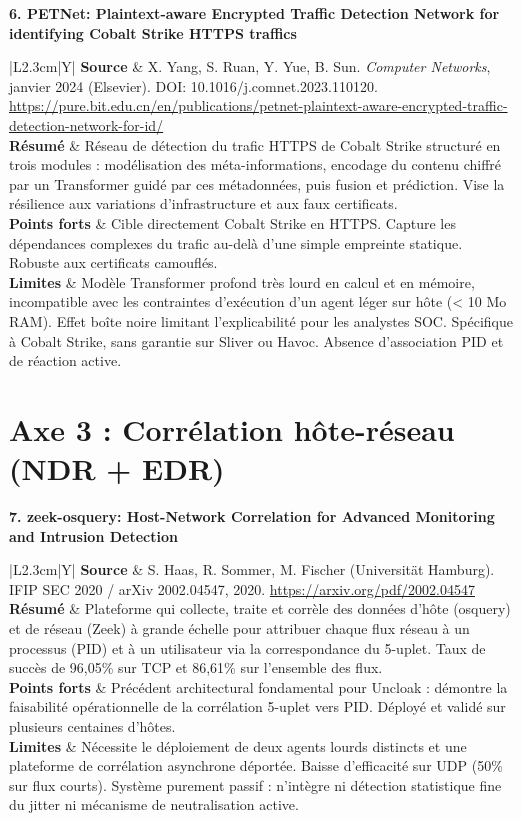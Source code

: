 \documentclass[10pt,a4paper]{article}
\newcommand{\articlecard}[5]{
    \noindent\textbf{#1}\par\vspace{1.2mm}
    \noindent\begin{tabularx}{\textwidth}{|L{2.3cm}|Y|}
        \hline
        \textbf{Source} & #2 \\ \hline
        \textbf{Résumé} & #3 \\ \hline
        \textbf{Points forts} & #4 \\ \hline
        \textbf{Limites} & #5 \\ \hline
    \end{tabularx}
    \vspace{3.5mm}
}
\begin{document}
\articlecard{6. PETNet: Plaintext-aware Encrypted Traffic Detection Network for identifying Cobalt Strike HTTPS traffics}{
X. Yang, S. Ruan, Y. Yue, B. Sun. \textit{Computer Networks}, janvier 2024 (Elsevier). DOI: 10.1016/j.comnet.2023.110120.\newline
\url{https://pure.bit.edu.cn/en/publications/petnet-plaintext-aware-encrypted-traffic-detection-network-for-id/}
}{
Réseau de détection du trafic HTTPS de Cobalt Strike structuré en trois modules : modélisation des méta-informations, encodage du contenu chiffré par un Transformer guidé par ces métadonnées, puis fusion et prédiction. Vise la résilience aux variations d'infrastructure et aux faux certificats.
}{
Cible directement Cobalt Strike en HTTPS. Capture les dépendances complexes du trafic au-delà d'une simple empreinte statique. Robuste aux certificats camouflés.
}{
Modèle Transformer profond très lourd en calcul et en mémoire, incompatible avec les contraintes d'exécution d'un agent léger sur hôte (< 10 Mo RAM). Effet boîte noire limitant l'explicabilité pour les analystes SOC. Spécifique à Cobalt Strike, sans garantie sur Sliver ou Havoc. Absence d'association PID et de réaction active.
}

\section*{Axe 3 : Corrélation hôte-réseau (NDR + EDR)}

\articlecard{7. zeek-osquery: Host-Network Correlation for Advanced Monitoring and Intrusion Detection}{
S. Haas, R. Sommer, M. Fischer (Universität Hamburg). IFIP SEC 2020 / arXiv 2002.04547, 2020.\newline
\url{https://arxiv.org/pdf/2002.04547}
}{
Plateforme qui collecte, traite et corrèle des données d'hôte (osquery) et de réseau (Zeek) à grande échelle pour attribuer chaque flux réseau à un processus (PID) et à un utilisateur via la correspondance du 5-uplet. Taux de succès de 96,05\% sur TCP et 86,61\% sur l'ensemble des flux.
}{
Précédent architectural fondamental pour Uncloak : démontre la faisabilité opérationnelle de la corrélation 5-uplet vers PID. Déployé et validé sur plusieurs centaines d'hôtes.
}{
Nécessite le déploiement de deux agents lourds distincts et une plateforme de corrélation asynchrone déportée. Baisse d'efficacité sur UDP (50\% sur flux courts). Système purement passif : n'intègre ni détection statistique fine du jitter ni mécanisme de neutralisation active.
}

\newpage
\end{document}
